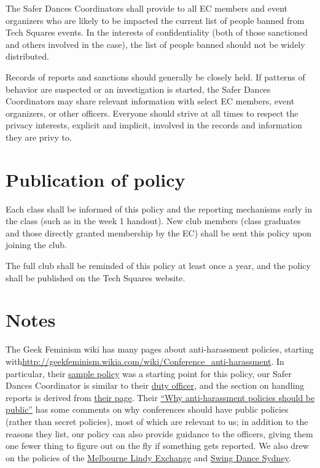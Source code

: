 \documentclass{article}
\begin{document}
The Safer Dances Coordinators shall provide to all EC members and event organizers who are likely to be impacted the current list of people banned from Tech Squares events. In the interests of confidentiality (both of those sanctioned and others involved in the case), the list of people banned should not be widely distributed.

Records of reports and sanctions should generally be closely held. If patterns of behavior are suspected or an investigation is started, the Safer Dances Coordinators may share relevant information with select EC members, event organizers, or other officers. Everyone should strive at all times to respect the privacy interests, explicit and implicit, involved in the records and information they are privy to.


\section{Publication of policy}

Each class shall be informed of this policy and the reporting mechanisms early in the class (such as in the week 1 handout). New club members (class graduates and those directly granted membership by the EC) shall be sent this policy upon joining the club.

The full club shall be reminded of this policy at least once a year, and the policy shall be published on the Tech Squares website.


\section{Notes}

The Geek Feminism wiki has many pages about anti-harassment policies, starting with\linebreak\url{http://geekfeminism.wikia.com/wiki/Conference_anti-harassment}. In particular, their \href{http://geekfeminism.wikia.com/wiki/Conference_anti-harassment/Policy}{sample policy} was a starting point for this policy, our Safer Dances Coordinator is similar to their \href{http://geekfeminism.wikia.com/wiki/Conference_anti-harassment/Duty_officer}{duty officer}, and the section on handling reports is derived from \href{http://geekfeminism.wikia.com/wiki/Conference_anti-harassment/Responding_to_reports}{their page}. Their \href{http://geekfeminism.wikia.com/wiki/Why_anti-harassment_policies_should_be_public}{``Why anti-harassment policies should be public''} has some comments on why conferences should have public policies (rather than secret policies), most of which are relevant to us; in addition to the reasons they list, our policy can also provide guidance to the officers, giving them one fewer thing to figure out on the fly if something gets reported. We also drew on the policies of the \href{https://docs.google.com/document/d/1hh9mXPxmazx8r1W1YKEzOWGwC3iTGX0qyiQOEYzFk9Q/pub}{Melbourne Lindy Exchange} and \href{http://swingdancesydney.com/codeofconduct.html}{Swing Dance Sydney}.
\end{document}
